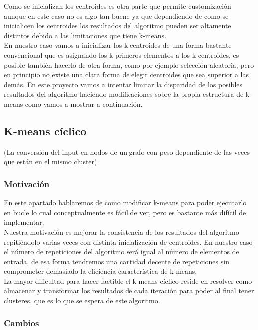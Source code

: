 \documentclass[12pt,a4paper]{article}
\begin{document}
			Como se inicializan los centroides es otra parte que permite customización aunque en este caso no es algo tan bueno ya que dependiendo de como se inicialicen los centroides los resultados del algoritmo pueden ser altamente distintos debido a las limitaciones que tiene k-means.\\
			En nuestro caso vamos a inicializar los k centroides de una forma bastante convencional que es asignando los k primeros elementos a los k centroides, es posible también hacerlo de otra forma, como por ejemplo selección aleatoria, pero en principio no existe una clara forma de elegir centroides que sea superior a las demás.
			En este proyecto vamos a intentar limitar la disparidad de los posibles resultados del algoritmo haciendo modificaciones sobre la propia estructura de k-means como vamos a mostrar a continuación.
			\subsection{K-means cíclico}
			
			(La conversión del input en nodos de un grafo con peso dependiente de las veces que están en el mismo cluster)
			\subsubsection{Motivación}
			En este apartado hablaremos de como modificar k-means para poder ejecutarlo en bucle lo cual conceptualmente es fácil de ver, pero es bastante más difícil de implementar.\\
			Nuestra motivación es mejorar la consistencia de los resultados del algoritmo repitiéndolo varias veces con distinta inicialización de centroides. En nuestro caso el número de repeticiones del algoritmo será igual al número de elementos de entrada, de esa forma tendremos una cantidad decente de repeticiones sin comprometer demasiado la eficiencia característica de k-means.\\
			La mayor dificultad para hacer factible el k-means cíclico reside en resolver como almacenar y transformar los resultados de cada iteración para poder al final tener clusteres, que es lo que se espera de este algoritmo. \\
			
			\subsubsection{Cambios}
			
\end{document}

